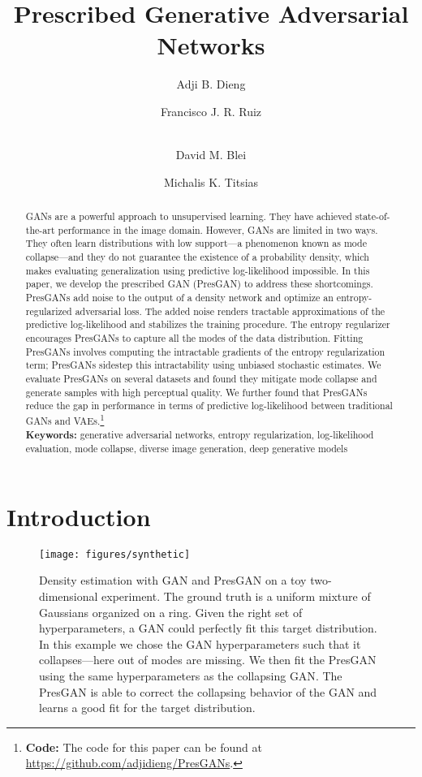 \documentclass[11pt]{article}
\title{\textbf{Prescribed Generative Adversarial Networks}}
\author[1]{Adji B. Dieng}
\author[2, 3]{Francisco J. R. Ruiz}
\author[1, 2]{\\David M. Blei}
\author[4]{Michalis K. Titsias}
\affil[1]{Department of Statistics, Columbia University}
\affil[2]{Department of Computer Science, Columbia University}
\affil[3]{Department of Engineering, University of Cambridge}
\affil[4]{DeepMind}
\begin{document}
\maketitle


\begin{abstract}
\noindent \Glspl{GAN} are a powerful approach to unsupervised learning. They have achieved state-of-the-art performance in the image domain. However, \glspl{GAN} are limited in two ways. They often learn distributions with low support---a phenomenon known as mode collapse---and they do not guarantee the existence of a probability density, which makes evaluating generalization using predictive log-likelihood impossible. In this paper, we develop the prescribed \gls{GAN} (Pres\gls{GAN}) to address these shortcomings. Pres\glspl{GAN} add noise to the output of a density network and optimize an entropy-regularized adversarial loss. The added noise renders tractable approximations of the predictive log-likelihood and stabilizes the training procedure. The entropy regularizer encourages Pres\glspl{GAN} to capture all the modes of the data distribution. Fitting Pres\glspl{GAN} involves computing the intractable gradients of the entropy regularization term; Pres\glspl{GAN} sidestep this intractability using unbiased stochastic estimates. We evaluate Pres\glspl{GAN} on several datasets and found they mitigate mode collapse and generate samples with high perceptual quality. We further found that Pres\glspl{GAN} reduce the gap in performance in terms of predictive log-likelihood between traditional \glspl{GAN} and \glspl{VAE}.\footnote{\textbf{Code:} The code for this paper can be found at \url{https://github.com/adjidieng/PresGANs}.}\\

\noindent \textbf{Keywords:} generative adversarial networks, entropy regularization, log-likelihood evaluation, mode collapse, diverse image generation, deep generative models
\end{abstract}


\section{Introduction}
\label{sec:introduction}
\glsresetall

\begin{figure*}[t]
	\centerline{\texttt{[image: figures/synthetic]}}
	\caption{Density estimation with \acrshort{GAN} and Pres\acrshort{GAN} on a toy two-dimensional experiment. The ground truth is a uniform mixture of  Gaussians organized on a ring. Given the right set of hyperparameters, a \acrshort{GAN} could perfectly fit this target distribution. In this example we chose the \acrshort{GAN} hyperparameters such that it collapses---here  out of  modes are missing. We then fit the Pres\acrshort{GAN} using the same hyperparameters as the collapsing \acrshort{GAN}. The Pres\acrshort{GAN} is able to correct the collapsing behavior of the \acrshort{GAN} and learns a good fit for the target distribution.}
	\label{fig:toy_example_fig1}
\end{figure*}
\end{document}
